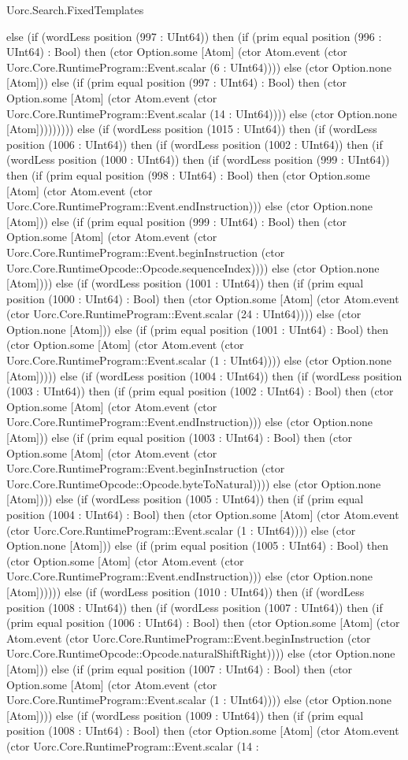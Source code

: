 \begin{lexlean}{Uorc.Search.FixedTemplates}
\begin{semanticmodule}
{else (if (wordLess position (997 : UInt64)) then (if (prim equal position (996 : UInt64) : Bool) then (ctor Option.some [Atom] (ctor Atom.event (ctor Uorc.Core.RuntimeProgram::Event.scalar (6 : UInt64)))) else (ctor Option.none [Atom])) else (if (prim equal position (997 : UInt64) : Bool) then (ctor Option.some [Atom] (ctor Atom.event (ctor Uorc.Core.RuntimeProgram::Event.scalar (14 : UInt64)))) else (ctor Option.none [Atom])))))))) else (if (wordLess position (1015 : UInt64)) then (if (wordLess position (1006 : UInt64)) then (if (wordLess position (1002 : UInt64)) then (if (wordLess position (1000 : UInt64)) then (if (wordLess position (999 : UInt64)) then (if (prim equal position (998 : UInt64) : Bool) then (ctor Option.some [Atom] (ctor Atom.event (ctor Uorc.Core.RuntimeProgram::Event.endInstruction))) else (ctor Option.none [Atom])) else (if (prim equal position (999 : UInt64) : Bool) then (ctor Option.some [Atom] (ctor Atom.event (ctor Uorc.Core.RuntimeProgram::Event.beginInstruction (ctor Uorc.Core.RuntimeOpcode::Opcode.sequenceIndex)))) else (ctor Option.none [Atom]))) else (if (wordLess position (1001 : UInt64)) then (if (prim equal position (1000 : UInt64) : Bool) then (ctor Option.some [Atom] (ctor Atom.event (ctor Uorc.Core.RuntimeProgram::Event.scalar (24 : UInt64)))) else (ctor Option.none [Atom])) else (if (prim equal position (1001 : UInt64) : Bool) then (ctor Option.some [Atom] (ctor Atom.event (ctor Uorc.Core.RuntimeProgram::Event.scalar (1 : UInt64)))) else (ctor Option.none [Atom])))) else (if (wordLess position (1004 : UInt64)) then (if (wordLess position (1003 : UInt64)) then (if (prim equal position (1002 : UInt64) : Bool) then (ctor Option.some [Atom] (ctor Atom.event (ctor Uorc.Core.RuntimeProgram::Event.endInstruction))) else (ctor Option.none [Atom])) else (if (prim equal position (1003 : UInt64) : Bool) then (ctor Option.some [Atom] (ctor Atom.event (ctor Uorc.Core.RuntimeProgram::Event.beginInstruction (ctor Uorc.Core.RuntimeOpcode::Opcode.byteToNatural)))) else (ctor Option.none [Atom]))) else (if (wordLess position (1005 : UInt64)) then (if (prim equal position (1004 : UInt64) : Bool) then (ctor Option.some [Atom] (ctor Atom.event (ctor Uorc.Core.RuntimeProgram::Event.scalar (1 : UInt64)))) else (ctor Option.none [Atom])) else (if (prim equal position (1005 : UInt64) : Bool) then (ctor Option.some [Atom] (ctor Atom.event (ctor Uorc.Core.RuntimeProgram::Event.endInstruction))) else (ctor Option.none [Atom]))))) else (if (wordLess position (1010 : UInt64)) then (if (wordLess position (1008 : UInt64)) then (if (wordLess position (1007 : UInt64)) then (if (prim equal position (1006 : UInt64) : Bool) then (ctor Option.some [Atom] (ctor Atom.event (ctor Uorc.Core.RuntimeProgram::Event.beginInstruction (ctor Uorc.Core.RuntimeOpcode::Opcode.naturalShiftRight)))) else (ctor Option.none [Atom])) else (if (prim equal position (1007 : UInt64) : Bool) then (ctor Option.some [Atom] (ctor Atom.event (ctor Uorc.Core.RuntimeProgram::Event.scalar (1 : UInt64)))) else (ctor Option.none [Atom]))) else (if (wordLess position (1009 : UInt64)) then (if (prim equal position (1008 : UInt64) : Bool) then (ctor Option.some [Atom] (ctor Atom.event (ctor Uorc.Core.RuntimeProgram::Event.scalar (14 : }
\end{semanticmodule}
\end{lexlean}
